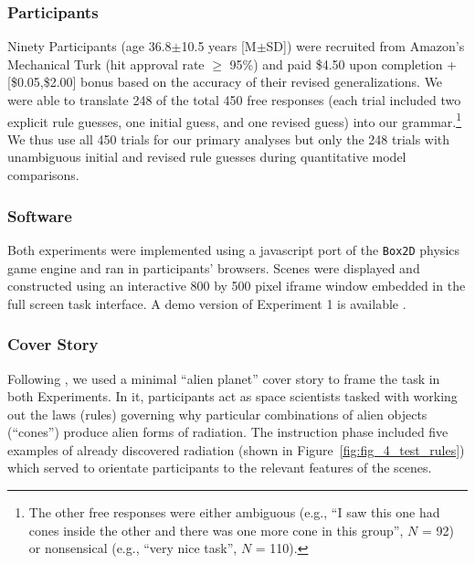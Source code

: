 \documentclass[doc,natbib,floatsintext]{apa7}
\newcommand{\MYhref}[3][blue]{\href{#2}{\color{#1}{#3}}}
\begin{document}
\subsubsection{Participants}
Ninety Participants (age 36.8$\pm$10.5 years [M$\pm$SD]) were recruited from Amazon's Mechanical Turk (hit approval rate $\geq$ 95\%) and paid \$4.50 upon completion + [\$0.05,\$2.00] bonus based on the accuracy of their revised generalizations. We were able to translate 248 of the total 450 free responses (each trial included two explicit rule guesses, one initial guess, and one revised guess) into our grammar.\footnote{The other free responses were either ambiguous (e.g., ``I saw this one had cones inside the other and there was one more cone in this group'', $N$ = 92) or nonsensical (e.g., ``very nice task'', $N$ = 110).} We thus use all 450 trials for our primary analyses but only the 248 trials with unambiguous initial and revised rule guesses during quantitative model comparisons.

\subsubsection{Software}
Both experiments were implemented using a javascript port of the {\tt Box2D} physics game engine and ran in participants' browsers. Scenes were displayed and constructed using an interactive 800 by 500 pixel iframe window embedded in the full screen task interface. A demo version of Experiment 1 is available \MYhref{https://zendo-cond-3.herokuapp.com/}{here}.


\subsubsection{Cover Story}
Following \citep{bramley2018grounding}, we used a minimal ``alien planet'' cover story to frame the task in both Experiments. In it, participants act as space scientists tasked with working out the laws (rules) governing why particular combinations of alien objects (``cones'') produce alien forms of radiation. The instruction phase included five examples of already discovered radiation (shown in Figure~\ref{fig:fig_4_test_rules}) which served to orientate participants to the relevant features of the scenes. 
\end{document}
